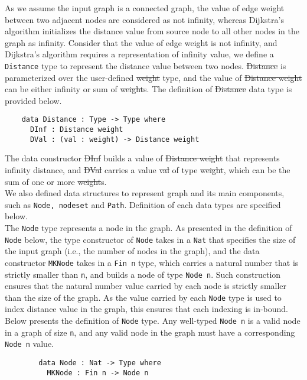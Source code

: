 As we assume the input graph is a connected graph, the value of edge weight between two adjacent nodes are considered as not infinity, whereas Dijkstra's algorithm initializes the distance value from source node to all other nodes in the graph as infinity. Consider that the value of edge weight is not infinity, and Dijkstra's algorithm requires a representation of infinity value, we define a \texttt{Distance} type to represent the distance value between two nodes. \st{Distance} is parameterized over the user-defined \st{weight} type, and the value of \st{Distance weight} can be either infinity or sum of \st{weight}s. The definition of \st{Distance} data type is provided below. 
\begin{lstlisting}
    data Distance : Type -> Type where
      DInf : Distance weight
      DVal : (val : weight) -> Distance weight
\end{lstlisting}

The data constructor \st{DInf} builds a value of \st{Distance weight} that represents infinity distance, and \st{DVal} carries a value \st{val} of type \st{weight}, which can be the sum of one or more \st{weight}s. 
\\

We also defined data structures to represent graph and its main components, such as \texttt{Node, nodeset} and \texttt{Path}. Definition of each data types are specified below. 
\\

The \texttt{Node} type represents a node in the graph. As presented in the definition of \texttt{Node} below, the type constructor of \texttt{Node} takes in a \texttt{Nat} that specifies the size of the input graph (i.e., the number of nodes in the graph), and the data constructor \texttt{MKNode} takes in a \texttt{Fin n} type, which carries a natural number that is strictly smaller than \texttt{n}, and builds a node of type \texttt{Node n}. Such construction ensures that the natural number value carried by each node is strictly smaller than the size of the graph. As the value carried by each \texttt{Node} type is used to index distance value in the graph, this ensures that each indexing is in-bound. Below presents the definition of \texttt{Node} type. Any well-typed \texttt{Node n} is a valid node in a graph of size \texttt{n}, and any valid node in the graph must have a corresponding \texttt{Node n} value. 

\begin{lstlisting}
		data Node : Nat -> Type where
		  MKNode : Fin n -> Node n
\end{lstlisting}

